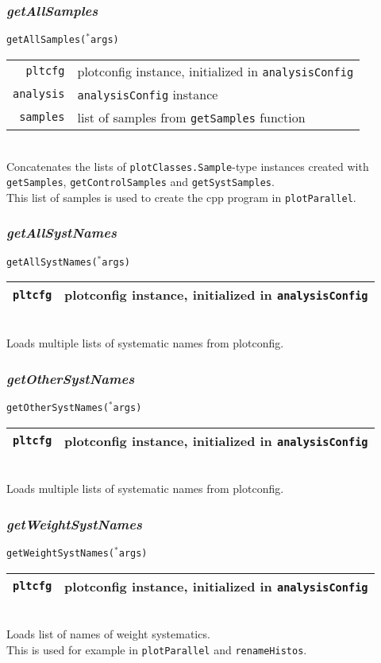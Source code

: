 \documentclass[12pt, a4paper]{article}
\newcommand{\args}{$^*$args}
\begin{document}
\subsubsection{\textit{getAllSamples}}
\texttt{getAllSamples(\args)}\\
\begin{tabular}{r|l}
\hline
\texttt{pltcfg} & plotconfig instance, initialized in \texttt{analysisConfig}\\
\texttt{analysis} & \texttt{analysisConfig} instance \\
\texttt{samples} & list of samples from \texttt{getSamples} function \\
\hline
\end{tabular}
\\
Concatenates the lists of \texttt{plotClasses.Sample}-type instances created with \texttt{getSamples}, \texttt{getControlSamples} and \texttt{getSystSamples}.\\
This list of samples is used to create the cpp program in \texttt{plotParallel}.


\subsubsection{\textit{getAllSystNames}}
\texttt{getAllSystNames(\args)}\\
\begin{tabular}{r|l}
\hline
\texttt{pltcfg} & plotconfig instance, initialized in \texttt{analysisConfig}\\
\hline
\end{tabular}
\\
Loads multiple lists of systematic names from plotconfig.

\subsubsection{\textit{getOtherSystNames}}
\texttt{getOtherSystNames(\args)}\\
\begin{tabular}{r|l}
\hline
\texttt{pltcfg} & plotconfig instance, initialized in \texttt{analysisConfig}\\
\hline
\end{tabular}
\\
Loads multiple lists of systematic names from plotconfig.


\subsubsection{\textit{getWeightSystNames}}
\texttt{getWeightSystNames(\args)}\\
\begin{tabular}{r|l}
\hline
\texttt{pltcfg} & plotconfig instance, initialized in \texttt{analysisConfig}\\
\hline
\end{tabular}
\\
Loads list of names of weight systematics.\\
This is used for example in \texttt{plotParallel} and \texttt{renameHistos}.
\end{document}
